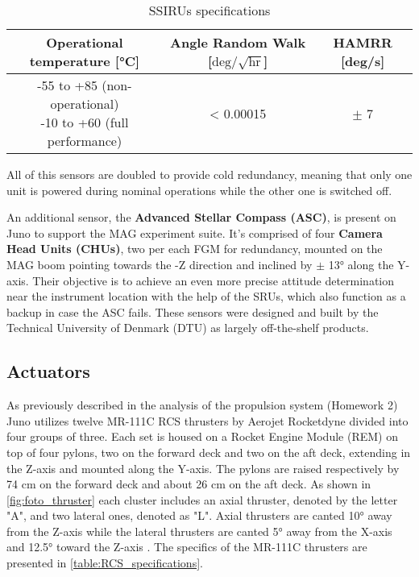 \begin{itemize}
\begin{table}[H]
        \vspace{5mm}

        \begin{tabular}{|c|c|c|}
            \hline
            \textbf{Operational temperature [°C]} & \textbf{Angle Random Walk [$\textrm{deg} / \sqrt{\textrm{hr}}$]} & \textbf{HAMRR [deg/s]} \\
            \hline
            \hline
            \makecell{-55 to +85 (non-operational) \\  -10 to +60 (full performance)} & < 0.00015 & $\pm$ 7 \\
            \hline
        \end{tabular}
        \caption{SSIRUs specifications}
        \label{table:SSIRU}
    \end{table}
\end{itemize}

All of this sensors are doubled to provide cold redundancy, meaning that only one unit is powered during nominal operations while the other one is switched off.

An additional sensor, the \textbf{Advanced Stellar Compass (ASC)}, is present on Juno to support the MAG experiment suite. It's comprised of four \textbf{Camera Head Units (CHUs)}, two per each FGM for redundancy, mounted on the MAG boom pointing towards the -Z direction and inclined by $\pm$ 13° along the Y-axis. Their objective is to achieve an even more precise attitude determination near the instrument location with the help of the SRUs, which also function as a backup in case the ASC fails. These sensors were designed and built by the Technical University of Denmark (DTU) as largely off-the-shelf products. \cite{ASC_details}

\subsection{Actuators}
\label{subsec:Actuators}

As previously described in the analysis of the propulsion system (Homework 2) Juno utilizes twelve MR-111C RCS thrusters by Aerojet Rocketdyne \cite{RCS_info} divided into four groups of three. Each set is housed on a Rocket Engine Module (REM) on top of four pylons, two on the forward deck and two on the aft deck, extending in the Z-axis and mounted along the Y-axis. 
The pylons are raised respectively by 74 cm on the forward deck and about 26 cm on the aft deck. As shown in \autoref{fig:foto_thruster} each cluster includes an axial thruster, denoted by the letter "A", and two lateral ones, denoted as "L".
Axial thrusters are canted 10° away from the Z-axis while the lateral thrusters are canted 5° away from the X-axis and 12.5° toward the Z-axis \cite{juno_inner}. The specifics of the MR-111C thrusters are presented in \autoref{table:RCS_specifications}. \cite{RCS_values}

